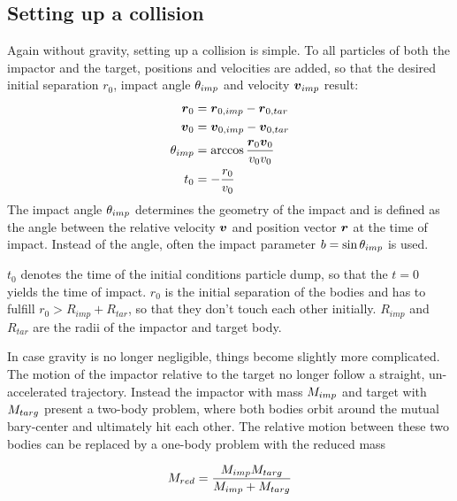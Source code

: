 \subsection{Setting up a collision}
\label{ch02_sec04_ss04}
\label{ch}
Again without gravity, setting up a collision is simple. To all particles of both the impactor and the target, positions and velocities are added, so that the desired initial separation $r_0$, impact angle $\theta_{imp}$ and velocity $\boldsymbol{v}_{imp}$ result:
\begin{align}
\label{ch02_aux_eq002}
\boldsymbol{r}_0 &= \boldsymbol{r}_{0,imp} -  \boldsymbol{r}_{0,tar} \\
\boldsymbol{v}_0 &= \boldsymbol{v}_{0,imp} -  \boldsymbol{v}_{0,tar} \\
\theta_{imp} &= \arccos{ \frac{\boldsymbol{r}_0 \boldsymbol{v}_0}{v_0 v_0} }\\
t_0 &= - \frac{r_0}{v_0}
\end{align}
The impact angle $\theta_{imp}$ determines the geometry of the impact and is defined as the angle between the relative velocity $\boldsymbol{v}$ and position vector $\boldsymbol{r}$ at the time of impact. Instead of the angle, often the impact parameter $b = \sin{\theta_{imp}}$ is used.

$t_0$ denotes the time of the initial conditions particle dump, so that the $t = 0$ yields the time of impact. $r_0$ is the initial separation of the bodies and has to fulfill $r_0 > R_{imp} + R_{tar}$, so that they don't touch each other initially. $R_{imp}$ and $R_{tar}$ are the radii of the impactor and target body.

In case gravity is no longer negligible, things become slightly more complicated. The motion of the impactor relative to the target no longer follow a straight, un-accelerated trajectory. Instead the impactor with mass $M_{imp}$ and target with $M_{targ}$ present a two-body problem, where both bodies orbit around the mutual bary-center and ultimately hit each other. The relative motion between these two bodies can be replaced by a one-body problem with the reduced mass

\begin{align}
\label{ch02_aux_eq003}
M_{red} = \frac{M_{imp} M_{targ}}{M_{imp} + M_{targ}}
\end{align}

